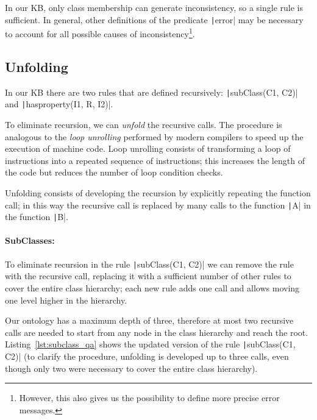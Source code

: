 In our KB, only class membership can generate inconsistency, so a single rule is sufficient. In general, other definitions of the predicate \texttt|error| may be necessary to account for all possible causes of inconsistency\footnote{However, this also gives us the possibility to define more precise error messages.}.

\subsection{Unfolding}
\label{sec:unfold}
In our KB there are two rules that are defined recursively: \texttt|subClass(C1, C2)| and \texttt|hasproperty(I1, R, I2)|. 

To eliminate recursion, we can \emph{unfold} the recursive calls. The procedure is analogous to the \emph{loop unrolling} performed by modern compilers to speed up the execution of machine code. Loop unrolling consists of transforming a loop of instructions into a repeated sequence of instructions; this increases the length of the code but reduces the number of loop condition checks.

Unfolding consists of developing the recursion by explicitly repeating the function call; in this way the recursive call is replaced by many calls to the function \texttt|A| in the function \texttt|B|.

\paragraph{SubClasses:} To eliminate recursion in the rule \texttt|subClass(C1, C2)| we can remove the rule with the recursive call, replacing it with a sufficient number of other rules to cover the entire class hierarchy; each new rule adds one call and allows moving one level higher in the hierarchy.

Our ontology has a maximum depth of three, therefore at most two recursive calls are needed to start from any node in the class hierarchy and reach the root. Listing~\ref{lst:subclass_qa} shows the updated version of the rule \texttt|subClass(C1, C2)| (to clarify the procedure, unfolding is developed up to three calls, even though only two were necessary to cover the entire class hierarchy).

\begin{listing}[h]
	\caption{Subclasses unfolding}
	\label{lst:subclass_qa}
\end{listing}

